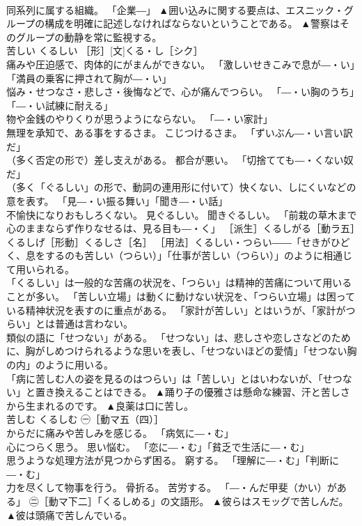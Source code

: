 \documentclass[8pt]{extreport}
\begin{document}
\begin{CJK}{UTF8}{min}
\\	同系列に属する組織。 「企業―」	▲囲い込みに関する要点は、エスニック・グループの構成を明確に記述しなければならないということである。 ▲警察はそのグループの動静を常に監視する。
\\	苦しい	くるしい	［形］[文]くる・し［シク］ 
\\	痛みや圧迫感で、肉体的にがまんができない。 「激しいせきこみで息が―・い」「満員の乗客に押されて胸が―・い」 
\\	悩み・せつなさ・悲しさ・後悔などで、心が痛んでつらい。 「―・い胸のうち」「―・い試練に耐える」 
\\	物や金銭のやりくりが思うようにならない。 「―・い家計」 
\\	無理を承知で、ある事をするさま。 こじつけるさま。 「ずいぶん―・い言い訳だ」 
\\	（多く否定の形で）差し支えがある。 都合が悪い。 「切捨てても―・くない奴だ」 
\\	（多く「ぐるしい」の形で、動詞の連用形に付いて）快くない、しにくいなどの意を表す。 「見―・い振る舞い」「聞き―・い話」 
\\	不愉快になりおもしろくない。 見ぐるしい。 聞きぐるしい。 「前栽の草木まで心のままならず作りなせるは、見る目も―・く」 ［派生］くるしがる［動ラ五］くるしげ［形動］くるしさ［名］ ［用法］くるしい・つらい――「せきがひどく、息をするのも苦しい（つらい）」「仕事が苦しい（つらい）」のように相通じて用いられる。 
\\	「くるしい」は一般的な苦痛の状況を、「つらい」は精神的苦痛について用いることが多い。 「苦しい立場」は動くに動けない状況を、「つらい立場」は困っている精神状況を表すのに重点がある。 「家計が苦しい」とはいうが、「家計がつらい」とは普通は言わない。 
\\	類似の語に「せつない」がある。 「せつない」は、悲しさや恋しさなどのために、胸がしめつけられるような思いを表し、「せつないほどの愛情」「せつない胸の内」のように用いる。 
\\	「病に苦しむ人の姿を見るのはつらい」は「苦しい」とはいわないが、「せつない」と置き換えることはできる。	▲踊り子の優雅さは懸命な練習、汗と苦しさから生まれるのです。 ▲良薬は口に苦し。
\\	苦しむ	くるしむ	㊀［動マ五（四）］ 
\\	からだに痛みや苦しみを感じる。 「病気に―・む」 
\\	心につらく思う。 思い悩む。 「恋に―・む」「貧乏で生活に―・む」 
\\	思うような処理方法が見つからず困る。 窮する。 「理解に―・む」「判断に―・む」 
\\	力を尽くして物事を行う。 骨折る。 苦労する。 「―・んだ甲斐（かい）がある」 ㊁［動マ下二］「くるしめる」の文語形。	▲彼らはスモッグで苦しんだ。 ▲彼は頭痛で苦しんでいる。

\end{CJK}
\end{document}

